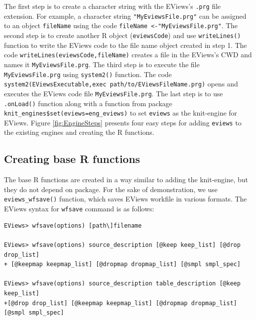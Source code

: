 The first step is to create a character string with the EViews's \texttt{.prg} file extension. For example, a character string \texttt{"MyEviewsFile.prg"} can be assigned to an object \texttt{fileName} using the code \texttt{fileName\ \textless{}-"MyEviewsFile.prg"}. The second step is to create another R object (\texttt{eviewsCode}) and use \texttt{writeLines()} function to write the EViews code to the file name object created in step 1. The code \texttt{writeLines(eviewsCode,fileName)} creates a file in the EViews's CWD and names it \texttt{MyEviewsFile.prg}. The third step is to execute the file \texttt{MyEviewsFile.prg} using \texttt{system2()} function. The code \texttt{system2(\textquotesingle{}EViewsExecutable\textquotesingle{},\textquotesingle{}exec\ path/to/EViewsFileName.prg\textquotesingle{})} opens and executes the EViews code file \texttt{MyEviewsFile.prg}. The last step is to use \texttt{.onLoad()} function along with a function from  package \texttt{knit\_engines\$set(eviews=eng\_eviews)} to set \texttt{eviews} as the knit-engine for EViews. Figure \ref{fig:EngineSteps} presents four easy steps for adding \texttt{eviews} to the existing  engines and creating the R functions.

\hypertarget{creating-base-r-functions}{%
\subsection{Creating base R functions}\label{creating-base-r-functions}}

The base R functions are created in a way similar to adding the knit-engine, but they do not depend on  package. For the sake of demonstration, we use \texttt{eviews\_wfsave()} function, which saves EViews workfile in various formats. The EViews syntax for \texttt{wfsave} command is as follows:

\begin{verbatim}
EViews> wfsave(options) [path\]filename

EViews> wfsave(options) source_description [@keep keep_list] [@drop drop_list] 
+ [@keepmap keepmap_list] [@dropmap dropmap_list] [@smpl smpl_spec]

EViews> wfsave(options) source_description table_description [@keep keep_list] 
+[@drop drop_list] [@keepmap keepmap_list] [@dropmap dropmap_list] [@smpl smpl_spec]
\end{verbatim}

